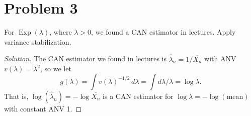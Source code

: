 \documentclass{article}
\renewcommand{\bar}[1]{\overline{#1}}
\DeclareMathOperator{\Exp}{Exp}
\begin{document}
\section{Problem 3}

For $\Exp(\lambda)$, where $\lambda > 0$, we found a CAN estimator in lectures. Apply variance stabilization.

\begin{proof}[Solution]
The CAN estimator we found in lectures is $\hat{\lambda}_n = 1/\bar{X_n}$ with ANV $v(\lambda) = \lambda^2$, so we let
\begin{equation*}
g(\lambda) = \int v(\lambda)^{-1/2}\,d\lambda = \int d\lambda/\lambda = \log\lambda.
\end{equation*}
That is, $\log(\hat{\lambda}_n) = -\log\bar{X_n}$ is a CAN estimator for $\log\lambda = -\log(\text{mean})$ with constant ANV 1.
\end{proof}
\end{document}
